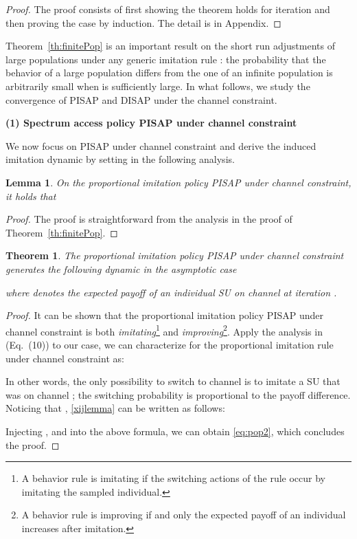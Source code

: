 \documentclass[12pt, onecolumn]{IEEEtran}
\theoremstyle{plain}
\newtheorem{lemma}{Lemma}
\newtheorem{theorem}{Theorem}
\theoremstyle{definition}
\begin{document}
\begin{proof}
The proof consists of first showing the theorem holds for iteration  and then proving the case  by induction. The detail is in Appendix.
\end{proof}

Theorem~\ref{th:finitePop} is an important result on the short run adjustments of large populations under any generic imitation rule : the probability that the behavior
of a large population differs from the one of an infinite population is arbitrarily small when  is sufficiently large. In what follows, we study the convergence of PISAP and DISAP under the channel constraint.

\noindent \textbf{(1) Spectrum access policy PISAP under channel constraint}

We now focus on PISAP under channel constraint and derive the induced imitation dynamic by setting  in the following analysis.

\begin{lemma}
On the proportional imitation policy PISAP under channel constraint, it holds that

\label{lemma:pop2}
\end{lemma}
\begin{proof}
The proof is straightforward from the analysis in the proof of Theorem~\ref{th:finitePop}.
\end{proof}






\begin{theorem}
The proportional imitation policy PISAP under channel constraint generates the following dynamic in the asymptotic case

where  denotes the expected payoff of an individual SU on channel  at iteration .
\label{th:pop2}
\end{theorem}


\begin{proof}
It can be shown that the proportional imitation policy PISAP under channel constraint is both {\it imitating}\footnote{A behavior rule is imitating if the switching actions of the rule occur by imitating the sampled individual.} and {\it improving}\footnote{A behavior rule is improving if and only the expected payoff of an individual increases after imitation.}. Apply the analysis in \cite{Schlag96} (Eq.~(10)) to our case, we can characterize  for the proportional imitation rule under channel constraint as:

In other words, the only possibility to switch to channel  is to imitate a SU that was on channel ; the switching probability is proportional to the payoff difference. Noticing that , \eqref{xijlemma} can be written as follows:


Injecting ,  and  into the above formula, we can obtain \eqref{eq:pop2}, which concludes the proof.
\end{proof}
\end{document}

